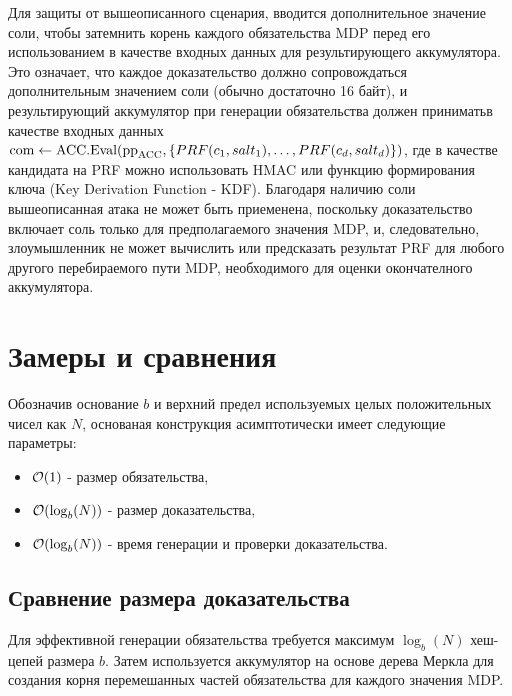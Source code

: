 Для защиты от вышеописанного сценария, вводится дополнительное значение соли, чтобы затемнить корень каждого обязательства MDP перед его использованием в качестве входных данных для результирующего аккумулятора.
Это означает, что каждое доказательство должно сопровождаться дополнительным значением соли (обычно достаточно 16 байт), и результирующий аккумулятор при генерации обязательства должен приниматьв  качестве входных данных $\text{com} \leftarrow \text{ACC}.\text{Eval}(\text{pp}_{\text{ACC}}, \{PRF(c_1, salt_1), \dots, PRF(c_d, salt_d)\})$, где в качестве кандидата на PRF можно использовать HMAC или функцию формирования ключа (Key Derivation Function - KDF).
Благодаря наличию соли вышеописанная атака не может быть приеменена, поскольку доказательство включает соль только для предполагаемого значения MDP, и, следовательно, злоумышленник не может вычислить или предсказать результат PRF для любого другого перебираемого пути MDP, необходимого для оценки окончателного аккумулятора.

\section{Замеры и сравнения}
Обозначив основание $b$ и верхний предел используемых целых положительных чисел как $N$, основаная конструкция асимптотически имеет следующие параметры:
\begin{itemize}
	\item $\mathcal{O}(1)$ - размер обязательства,
	\item $\mathcal{O}(\log_b(N))$ - размер доказательства,
	\item $\mathcal{O}(\log_b(N))$ - время генерации и проверки доказательства.
\end{itemize}

\subsection{Сравнение размера доказательства} %
Для эффективной генерации обязательства требуется максимум $\log_b(N)$ хеш-цепей размера $b$.
Затем используется аккумулятор на основе дерева Меркла для создания корня перемешанных частей обязательства для каждого значения MDP.

